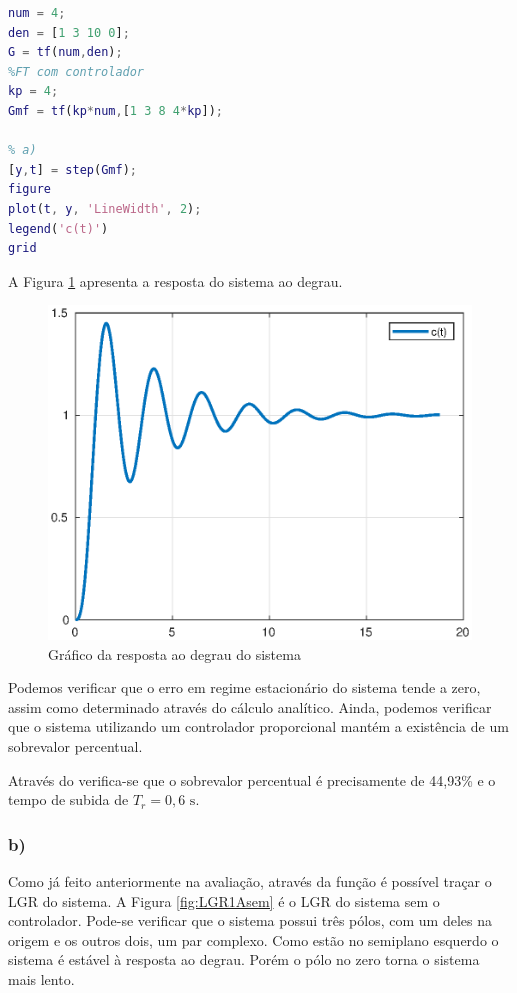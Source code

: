     \begin{lstlisting}[language=Matlab,label=Q1A,caption=Análise da estabilidade]
%FT sem controlador
num = 4;
den = [1 3 10 0];
G = tf(num,den);
%FT com controlador
kp = 4;
Gmf = tf(kp*num,[1 3 8 4*kp]);

% a)
[y,t] = step(Gmf);
figure
plot(t, y, 'LineWidth', 2);
legend('c(t)')
grid
    \end{lstlisting}

    A Figura \ref{fig:Q1A} apresenta a resposta do sistema ao degrau.


    \begin{figure}[!ht]
        \centering
        \includegraphics[width = 0.75\linewidth]{Figuras/ProblemasPI/Problema1/step1.eps}
        \caption{Gráfico da resposta ao degrau do sistema}
        \label{fig:Q1A}                   
    \end{figure}

    Podemos verificar que o erro em regime estacionário do sistema tende a zero, assim como determinado 
    através do cálculo analítico. Ainda, podemos verificar que o sistema utilizando um controlador proporcional
    mantém a existência de um sobrevalor percentual.

    Através do  verifica-se que o sobrevalor percentual é precisamente de 44,93\% e o tempo
    de subida de $T_r =0,6 \text{ s} $. 

\subsubsection*{b)}

    Como já feito anteriormente na avaliação, através da função  é possível traçar o LGR 
    do sistema. A Figura \ref{fig:LGR1Asem} é o LGR do sistema sem o controlador. Pode-se verificar que
    o sistema possui três pólos, com um deles na origem e os outros dois, um par complexo. Como estão 
    no semiplano esquerdo o sistema é estável à resposta ao degrau. Porém o pólo no zero torna o sistema
    mais lento.
    

